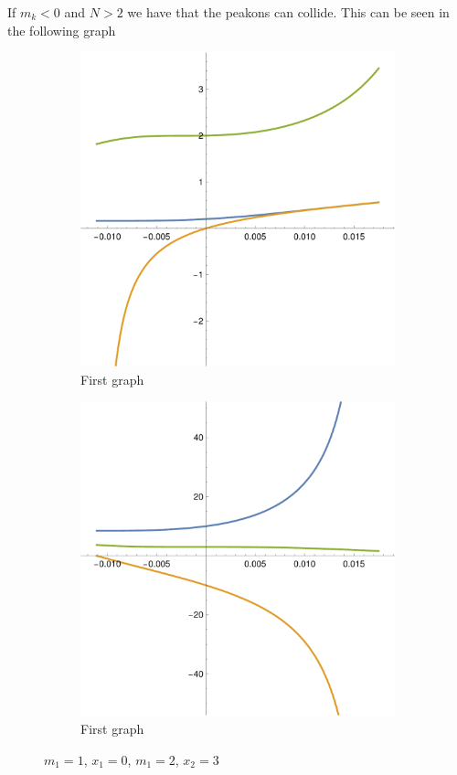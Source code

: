 \documentclass[english,master]{liumaiex}
\theoremstyle{plain}
\theoremstyle{definition}
\begin{document}
If $m_k < 0$ and $N > 2$ we have that the peakons can collide. This can be seen in the following graph
\begin{figure}[H]
	\begin{subfigure}{0.44\textwidth}
		\includegraphics[width=\textwidth]{graphs/3NCollision/x.pdf}
        \caption{First graph}
    \end{subfigure}
	\hfill
	\begin{subfigure}{0.44\textwidth}
		\includegraphics[width=\textwidth]{graphs/3NCollision/m.pdf}
        \caption{First graph}
    \end{subfigure}
    \caption{$m_1 = 1$, $x_1 = 0$, $m_1 = 2$, $x_2 = 3$}
\end{figure}
\end{document}
